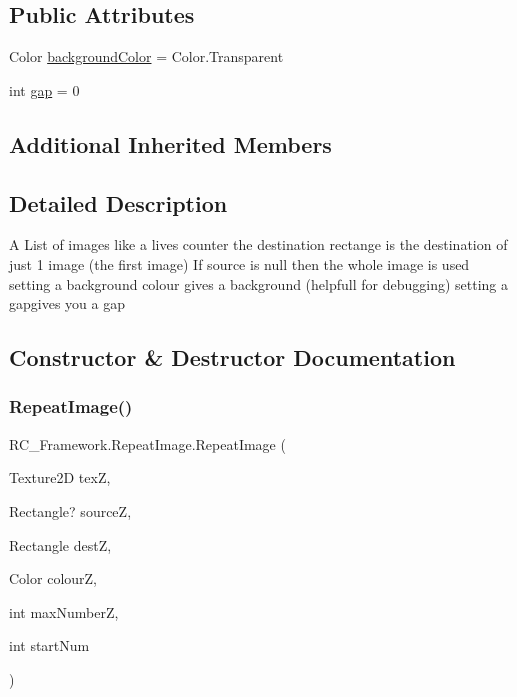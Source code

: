 \subsection*{Public Attributes}
\begin{DoxyCompactItemize}
\item 
Color \mbox{\hyperlink{class_r_c___framework_1_1_repeat_image_a37741513459c3910381e6574d2cc2132}{background\+Color}} = Color.\+Transparent
\item 
int \mbox{\hyperlink{class_r_c___framework_1_1_repeat_image_a6e4d724998e521f4af39bccfb036ffa6}{gap}} = 0
\end{DoxyCompactItemize}
\subsection*{Additional Inherited Members}


\subsection{Detailed Description}
A List of images like a lives counter the destination rectange is the destination of just 1 image (the first image) If source is null then the whole image is used setting a background colour gives a background (helpfull for debugging) setting a gapgives you a gap 



\subsection{Constructor \& Destructor Documentation}
\mbox{\label{class_r_c___framework_1_1_repeat_image_aaa671e1d98cedaf00dccb8b563b5dfc2}} 
\subsubsection{\texorpdfstring{Repeat\+Image()}{RepeatImage()}}
{\footnotesize\ttfamily R\+C\+\_\+\+Framework.\+Repeat\+Image.\+Repeat\+Image (\begin{DoxyParamCaption}\item[{Texture2D}]{texZ,  }\item[{Rectangle?}]{sourceZ,  }\item[{Rectangle}]{destZ,  }\item[{Color}]{colourZ,  }\item[{int}]{max\+NumberZ,  }\item[{int}]{start\+Num }\end{DoxyParamCaption})}



